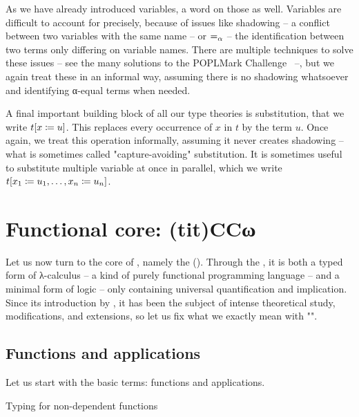 \AP As we have already introduced variables, a word on those as well. Variables are difficult
to account for precisely, because of issues like shadowing – a conflict between two variables
with the same name – or  $=_{\alpha}$ – the identification between two terms
only differing on variable names. There are multiple techniques to solve these issues
– see the many solutions to the POPLMark Challenge~ –, 
but we again treat these in an informal way, assuming
there is no shadowing whatsoever and identifying α-equal terms when needed.%

A final important building block of all our type theories is substitution,
that we write $t[x \coloneqq u]$. This replaces every occurrence of $x$ in $t$ by the term
$u$. Once again, we treat this operation informally, assuming it never creates
shadowing – what is sometimes called "capture-avoiding" substitution.
It is sometimes useful to substitute multiple variable at once in parallel,
which we write $t[x_1 \coloneqq u_1, \dots, x_n \coloneqq u_n]$.

\section{Functional core: \kl(tit){CCω}}
\label{sec:tech-ccw}

\AP Let us now turn to the core of , namely the
 (). Through the ,
it is both a typed form of λ-calculus – \ie a kind of purely functional
programming language – and a minimal form
of logic – only containing universal quantification and implication.
Since its introduction by , it has been the subject of intense
theoretical study, modifications, and extensions, so let us fix what we exactly mean
with "".

\subsection{Functions and applications}

Let us start with the basic terms: functions and applications.

\begin{marginfigure}
  \caption{Typing for non-dependent functions}
  \label{fig:cic-nondep-fun}
\end{marginfigure}

